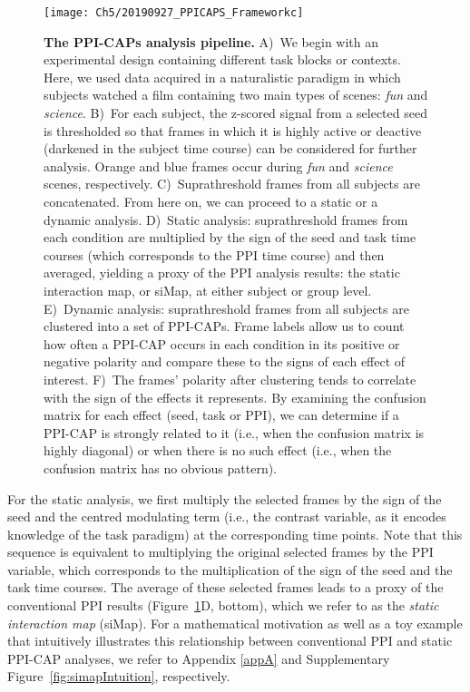 \begin{figure}[!ph]
\centering
\texttt{[image: Ch5/20190927\_PPICAPS\_Frameworkc]}
\caption{\textbf{The PPI-CAPs analysis pipeline.} A)~We begin with an experimental design containing different task blocks or contexts. Here, we used data acquired in a naturalistic paradigm in which subjects watched a film containing two main types of scenes: \textit{fun} and \textit{science}. B)~For each subject, the z-scored signal from a selected seed is thresholded so that frames in which it is highly active or deactive (darkened in the subject time course) can be considered for further analysis. Orange and blue frames occur during \textit{fun} and \textit{science} scenes, respectively. C)~Suprathreshold frames from all subjects are concatenated. From here on, we can proceed to a static or a dynamic analysis. D)~Static analysis: suprathreshold frames from each condition are multiplied by the sign of the seed and task time courses (which corresponds to the PPI time course) and then averaged, yielding a proxy of the PPI analysis results: the static interaction map, or siMap, at either subject or group level.  E)~Dynamic analysis: suprathreshold frames from all subjects are clustered into a set of PPI-CAPs. Frame labels allow us to count how often a PPI-CAP occurs in each condition in its positive or negative polarity and compare these to the signs of each effect of interest. F)~The frames' polarity after clustering tends to correlate with the sign of the effects it represents. By examining the confusion matrix for each effect (seed, task or PPI), we can determine if a PPI-CAP is strongly related to it (i.e., when the confusion matrix is highly diagonal) or when there is no such effect (i.e., when the confusion matrix has no obvious pattern). }
\label{PPI_CAPs_fw}
\end{figure}


For the static analysis, we first multiply the selected frames by the sign of the seed and the centred modulating term (i.e., the contrast variable, as it encodes knowledge of the task paradigm) at the corresponding time points. Note that this sequence is equivalent to multiplying the original selected frames by the PPI variable, which corresponds to the multiplication of the sign of the seed and the task time courses. The average of these selected frames leads to a proxy of the conventional PPI results (Figure~\ref{PPI_CAPs_fw}D, bottom), which we refer to as the \textit{static interaction map} (siMap). For a mathematical motivation as well as a toy example that intuitively illustrates this relationship between conventional PPI and static PPI-CAP analyses, we refer to Appendix \ref{appA} and Supplementary Figure~\ref{fig:simapIntuition}, respectively.

